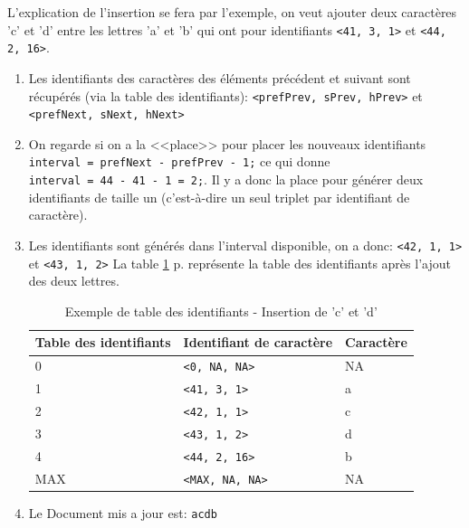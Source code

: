 		L'explication de l'insertion se fera par l'exemple, on veut ajouter deux
		caractères 'c' et 'd' entre les lettres 'a' et 'b' qui ont pour
		identifiants \verb+<41, 3, 1>+ et \verb+<44, 2, 16>+.
		\begin{enumerate}
			\item Les identifiants des caractères des éléments précédent et
			suivant sont récupérés (via la table des identifiants):
			\verb+<prefPrev, sPrev, hPrev>+ et \verb+<prefNext, sNext, hNext>+
			\item On regarde si on a la <<place>> pour placer les nouveaux
			identifiants\\ \verb+interval = prefNext - prefPrev - 1;+ ce qui
			donne\\ \verb+interval = 44 - 41 - 1 = 2;+. Il y a donc la place
			pour générer deux identifiants de taille un (c'est-à-dire un seul
			triplet	par	identifiant de caractère).
			\item Les identifiants sont générés dans l'interval disponible, on a
			donc: \verb+<42, 1, 1>+ et \verb+<43, 1, 2>+
			La table \ref{tab:tableID_cd} p.\pageref{tab:tableID_cd} représente
			la table des identifiants après l'ajout des deux lettres.
				
		\begin{table}
			\center
			\begin{tabular}{|l|l|l|}			
			\hline
				Table des identifiants & Identifiant de caractère & Caractère\\
			\hline
				0 & \verb+<0, NA, NA>+ & NA\\
				1 & \verb+<41, 3, 1>+ & a\\
				2 & \verb+<42, 1, 1>+ & c\\
				3 & \verb+<43, 1, 2>+ & d\\
				4 & \verb+<44, 2, 16>+ & b\\
				MAX & \verb+<MAX, NA, NA>+ & NA\\
			\hline
			\end{tabular}
			\caption{Exemple de table des identifiants - Insertion de 'c' et
			'd'}
			\label{tab:tableID_cd}
		\end{table}
			\item Le Document mis a jour est:
				\verb+acdb+
		\end{enumerate}~
		
